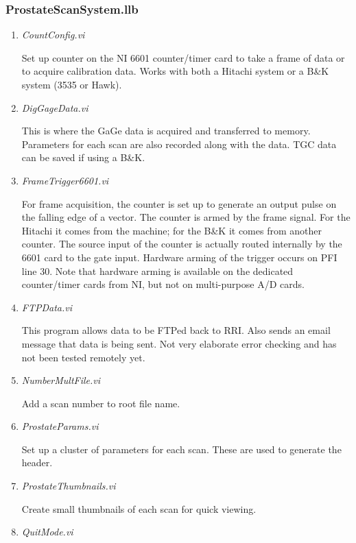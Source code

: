 \documentclass[10pt]{article}
\begin{document}
\subsubsection{ProstateScanSystem.llb}
\begin{enumerate}

\item {\it CountConfig.vi}

Set up counter on the NI 6601 counter/timer card to take a frame
of data or to acquire calibration data. Works with both a Hitachi
system or a B\&K system (3535 or Hawk).

\item {\it DigGageData.vi}

This is where the GaGe data is acquired and transferred to memory.
Parameters for each scan are also recorded along with the data.
TGC data can be saved if using a B\&K.


\item {\it FrameTrigger6601.vi}

For frame acquisition, the counter is set up to generate an output
pulse on the falling edge of a vector. The counter is armed by the
frame signal. For the Hitachi it comes from the machine; for the
B\&K it comes from another counter. The source input of the
counter is actually routed internally by the 6601 card to the gate
input. Hardware arming of the trigger occurs on PFI line 30. Note
that hardware arming is available on the dedicated counter/timer
cards from NI, but not on multi-purpose A/D cards.

\item {\it FTPData.vi}

This program allows data to be FTPed back to RRI. Also sends an
email message that data is being sent. Not very elaborate error
checking and has not been tested remotely yet.

\item {\it NumberMultFile.vi}

Add a scan number to root file name.

\item {\it ProstateParams.vi}

Set up a cluster of parameters for each scan. These are used to
generate the header.

\item {\it ProstateThumbnails.vi}

Create small thumbnails of each scan for quick viewing.

\item {\it QuitMode.vi}


\end{enumerate}
\end{document}
